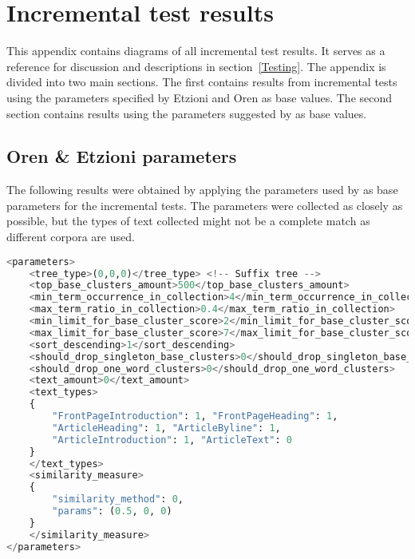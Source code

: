 
\chapter{Incremental test results} %

\label{AppendixA} %


This appendix contains diagrams of all incremental test results. It serves as a reference for discussion and descriptions in section~\ref{Testing}. The appendix is divided into two main sections. The first contains results from incremental tests using the parameters specified by Etzioni and Oren as base values. The second section contains results using the parameters suggested by \supervisor as base values.

\section{Oren \& Etzioni parameters}

The following results were obtained by applying the parameters used by \citeauthor{Oren1998} as base parameters for the incremental tests. The parameters were collected as closely as possible, but the types of text collected might not be a complete match as different corpora are used.

\begin{lstlisting}[float=t, language=python, label=lst:etzioniparams, caption={Parameter set used in Oren and Etzioni.}]
<parameters>
    <tree_type>(0,0,0)</tree_type> <!-- Suffix tree -->
    <top_base_clusters_amount>500</top_base_clusters_amount>
    <min_term_occurrence_in_collection>4</min_term_occurrence_in_collection>
    <max_term_ratio_in_collection>0.4</max_term_ratio_in_collection>
    <min_limit_for_base_cluster_score>2</min_limit_for_base_cluster_score>
    <max_limit_for_base_cluster_score>7</max_limit_for_base_cluster_score>
    <sort_descending>1</sort_descending>
    <should_drop_singleton_base_clusters>0</should_drop_singleton_base_clusters>
    <should_drop_one_word_clusters>0</should_drop_one_word_clusters>
    <text_amount>0</text_amount>
    <text_types>
    {
    	"FrontPageIntroduction": 1, "FrontPageHeading": 1,
    	"ArticleHeading": 1, "ArticleByline": 1,
    	"ArticleIntroduction": 1, "ArticleText": 0
    }
    </text_types>
    <similarity_measure>
    {
    	"similarity_method": 0,
    	"params": (0.5, 0, 0)
    }
   	</similarity_measure>
</parameters>
\end{lstlisting}

